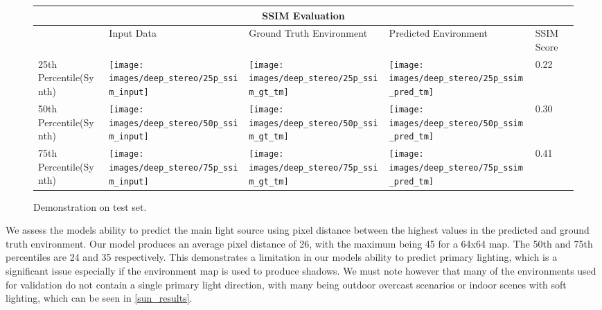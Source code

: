 \documentclass[ %
                    author={Gavin Parker},
                supervisor={Dr. Neill Campbell},
                    degree={MEng},
                     title={Deep Siamese Networks for Illumination Estimation from Stereo Images},
                  subtitle={},
                      type={Research},
                      year={2018} ]{dissertation}
\begin{document}
 \newline
 \begin{figure}[H]
\centering
\begin{tabular}{ |p{3cm}||p{3cm}|p{3cm}|p{3cm}|p{3cm}|  }
 \hline
 \multicolumn{5}{|c|}{SSIM Evaluation} \\
 \hline
  & Input Data &Ground Truth Environment&Predicted Environment&SSIM Score\\
 \hline
 25th Percentile(Synth)&\parbox[c]{1em}{
 \texttt{[image: images/deep\_stereo/25p\_ssim\_input]}}&\parbox[c]{1em}{\texttt{[image: images/deep\_stereo/25p\_ssim\_gt\_tm]}}&
\parbox[c]{1em}{\texttt{[image: images/deep\_stereo/25p\_ssim\_pred\_tm]}}& 0.22\\
 50th Percentile(Synth)&\parbox[c]{1em}{
 \texttt{[image: images/deep\_stereo/50p\_ssim\_input]}}&\parbox[c]{1em}{\texttt{[image: images/deep\_stereo/50p\_ssim\_gt\_tm]}}&
\parbox[c]{1em}{\texttt{[image: images/deep\_stereo/50p\_ssim\_pred\_tm]}}& 0.30\\
 75th Percentile(Synth)&\parbox[c]{1em}{
 \texttt{[image: images/deep\_stereo/75p\_ssim\_input]}}&\parbox[c]{1em}{\texttt{[image: images/deep\_stereo/75p\_ssim\_gt\_tm]}}&
\parbox[c]{1em}{\texttt{[image: images/deep\_stereo/75p\_ssim\_pred\_tm]}}& 0.41\\

 \hline
\end{tabular}

\label{ssim_results}
\caption{Demonstration on test set.}

\end{figure}
 We assess the models ability to predict the main light source using pixel distance between the highest values in the predicted and ground truth environment. Our model produces an average pixel distance of 26, with the maximum being 45 for a 64x64 map. The 50th and 75th percentiles are 24 and 35 respectively. This demonstrates a limitation in our models ability to predict primary lighting, which is a significant issue especially if the environment map is used to produce shadows. We must note however that many of the environments used for validation do not contain a single primary light direction, with many being outdoor overcast scenarios or indoor scenes with soft lighting, which can be seen in \ref{sun_results}.
\end{document}
